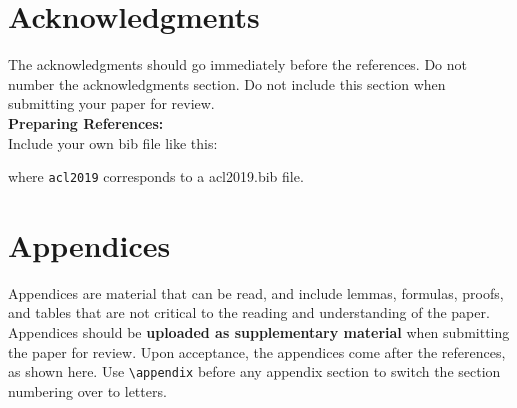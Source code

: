 \documentclass[11pt,a4paper]{article}
\begin{document}
\section*{Acknowledgments}

The acknowledgments should go immediately before the references.  Do
not number the acknowledgments section. Do not include this section
when submitting your paper for review. \\

\noindent \textbf{Preparing References:} \\
Include your own bib file like this:
\verb||
\verb|| 

where \verb|acl2019| corresponds to a acl2019.bib file.



\appendix

\section{Appendices}
\label{sec:appendix}
Appendices are material that can be read, and include lemmas, formulas, proofs, and tables that are not critical to the reading and understanding of the paper. 
Appendices should be \textbf{uploaded as supplementary material} when submitting the paper for review. Upon acceptance, the appendices come after the references, as shown here. Use
\verb|\appendix| before any appendix section to switch the section
numbering over to letters. 
\end{document}
